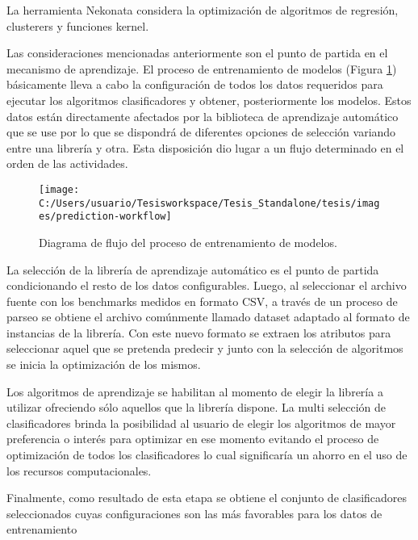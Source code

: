 La herramienta Nekonata considera la optimización de algoritmos de
regresión, clusterers y funciones kernel. 

Las consideraciones mencionadas anteriormente son el punto de partida
en el mecanismo de aprendizaje. El proceso de entrenamiento de modelos
(Figura \ref{fig:prediction-workflow}) básicamente lleva a cabo la
configuración de todos los datos requeridos para ejecutar los algoritmos
clasificadores y obtener, posteriormente los modelos. Estos datos
están directamente afectados por la biblioteca de aprendizaje automático
que se use por lo que se dispondrá de diferentes opciones de selección
variando entre una librería y otra. Esta disposición dio lugar a un
flujo determinado en el orden de las actividades. 

\begin{figure}
\begin{centering}
\texttt{[image: C:/Users/usuario/Tesisworkspace/Tesis\_Standalone/tesis/images/prediction-workflow]}
\par\end{centering}

\caption{Diagrama de flujo del proceso de entrenamiento de modelos.\label{fig:prediction-workflow}}
\end{figure}


La selección de la librería de aprendizaje automático es el punto
de partida condicionando el resto de los datos configurables. Luego,
al seleccionar el archivo fuente con los benchmarks medidos en formato
CSV, a través de un proceso de parseo se obtiene el archivo comúnmente
llamado dataset adaptado al formato de instancias de la librería.
Con este nuevo formato se extraen los atributos para seleccionar aquel
que se pretenda predecir y junto con la selección de algoritmos se
inicia la optimización de los mismos. 

Los algoritmos de aprendizaje se habilitan al momento de elegir la
librería a utilizar ofreciendo sólo aquellos que la librería dispone.
La multi selección de clasificadores brinda la posibilidad al usuario
de elegir los algoritmos de mayor preferencia o interés para optimizar
en ese momento evitando el proceso de optimización de todos los clasificadores
lo cual significaría un ahorro en el uso de los recursos computacionales. 

Finalmente, como resultado de esta etapa se obtiene el conjunto de
clasificadores seleccionados cuyas configuraciones son las más favorables
para los datos de entrenamiento 


